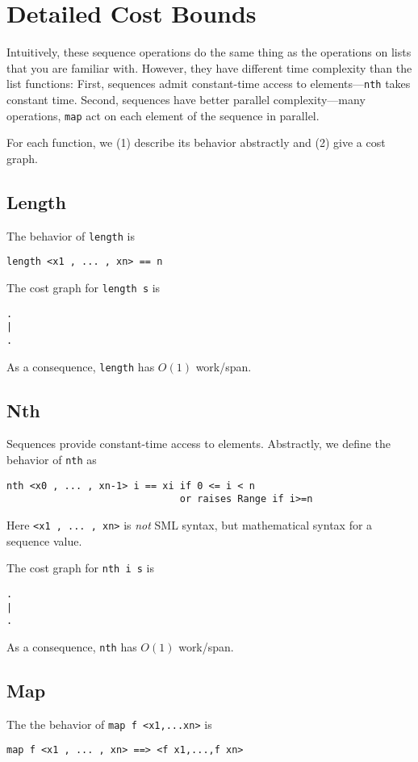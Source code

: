 \section{Detailed Cost Bounds}
Intuitively, these sequence operations do the same thing as the
operations on lists that you are familiar with.  However, they have
different time complexity than the list functions: First, sequences
admit constant-time access to elements---\verb|nth| takes constant time.
Second, sequences have better parallel complexity---many operations,
\verb|map| act on each element of the sequence in parallel.

For each function, we (1) describe its behavior abstractly and (2) give
a cost graph.

\subsection*{Length}
The behavior of \verb|length| is
\begin{verbatim}
length <x1 , ... , xn> == n
\end{verbatim}

The cost graph for \verb|length s| is
\begin{verbatim}
.
|
.
\end{verbatim}
As a consequence, \verb|length| has $O(1)$ work/span.

\subsection*{Nth}

Sequences provide constant-time access to elements.  Abstractly, we
define the behavior of \verb|nth| as
\begin{verbatim}
nth <x0 , ... , xn-1> i == xi if 0 <= i < n
                              or raises Range if i>=n
\end{verbatim}
Here \verb|<x1 , ... , xn>| is \emph{not} SML syntax, but mathematical
syntax for a sequence value.

The cost graph for \verb|nth i s| is
\begin{verbatim}
.
|
.
\end{verbatim}
As a consequence, \verb|nth| has $O(1)$ work/span.



\subsection*{Map}
The the behavior of \verb|map f <x1,...xn>| is
\begin{verbatim}
map f <x1 , ... , xn> ==> <f x1,...,f xn>
\end{verbatim}

